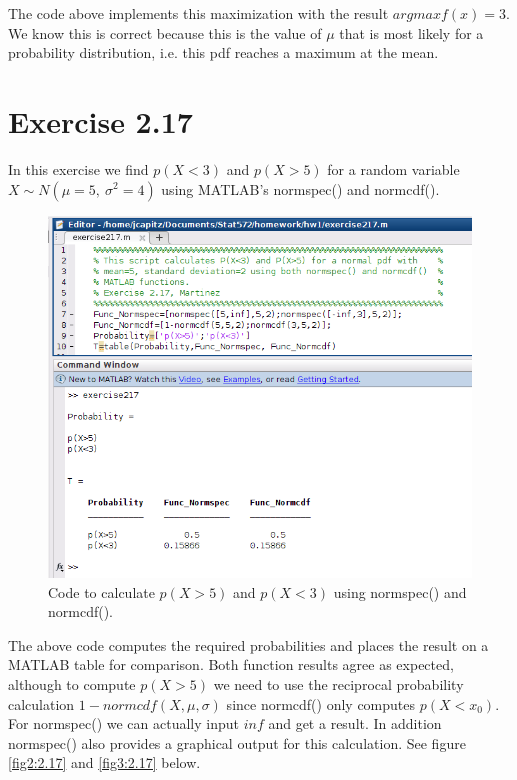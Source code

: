 \documentclass[12pt,a4paper]{article}
\begin{document}
\FloatBarrier

The code above implements this maximization with the result $argmax f(x)=3$. We know this is correct because this is the value of $\mu$ that is most likely for a probability distribution, i.e. this pdf reaches a maximum at the mean.

\section*{Exercise 2.17}

In this exercise we find $p(X<3)$ and $p(X>5)$ for a random variable $X\sim N(\mu=5,\ \sigma^2=4)$ using MATLAB's normspec() and normcdf(). 

\begin{figure}[ht!]
\includegraphics[scale=.70]{exercise217.png}
\caption{Code to calculate $p(X>5)$ and $p(X<3)$ using normspec() and normcdf().}
\label{fig1:2.17}
\end{figure}
\FloatBarrier

The above code computes the required probabilities and places the result on a MATLAB table for comparison. Both function results agree as expected, although to compute $p(X>5)$ we need to use the reciprocal probability calculation $1-normcdf(X,\mu,\sigma)$ since normcdf() only computes $p(X<x_0)$. For normspec() we can actually input $inf$ and get a result. In addition normspec() also provides a graphical output for this calculation. See figure \ref{fig2:2.17} and \ref{fig3:2.17} below.
\end{document}
